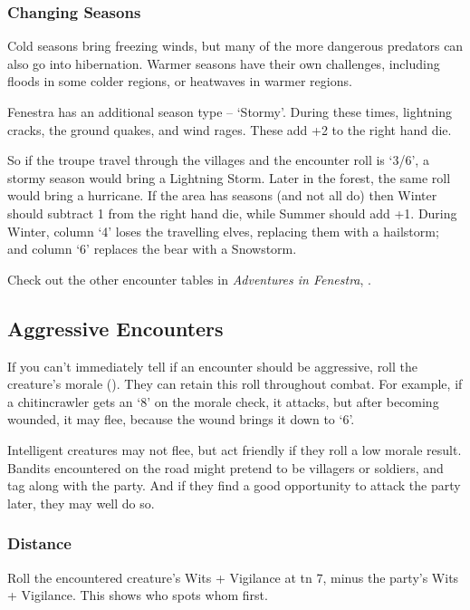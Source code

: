 \begin{multicols}{2}
\subsubsection{Changing Seasons}

Cold seasons bring freezing winds, but many of the more dangerous predators can also go into hibernation.
Warmer seasons have their own challenges, including floods in some colder regions, or heatwaves in warmer regions.

Fenestra has an additional season type -- `Stormy'.
During these times, lightning cracks, the ground quakes, and wind rages.
These add +2 to the right hand die.

So if the troupe travel through the villages and the encounter roll is `3/6', a stormy season would bring a Lightning Storm.
Later in the forest, the same roll would bring a hurricane.
If the area has seasons (and not all do) then Winter should subtract 1 from the right hand die, while Summer should add +1.
During Winter, column `4' loses the travelling elves, replacing them with a hailstorm; and column `6' replaces the bear with a Snowstorm.

Check out the other encounter tables in \textit{Adventures in Fenestra}, .

\subsection{Aggressive Encounters}

If you can't immediately tell if an encounter should be aggressive, roll the creature's morale ().
They can retain this roll throughout combat.
For example, if a chitincrawler gets an `8' on the morale check, it attacks, but after becoming wounded, it may flee, because the wound brings it down to `6'.

Intelligent creatures may not flee, but act friendly if they roll a low morale result.
Bandits encountered on the road might pretend to be villagers or soldiers, and tag along with the party.
And if they find a good opportunity to attack the party later, they may well do so.

\subsubsection{Distance}

Roll the encountered creature's Wits + Vigilance at \gls{tn} 7, minus the party's Wits + Vigilance.
This shows who spots whom first.


\end{multicols}
